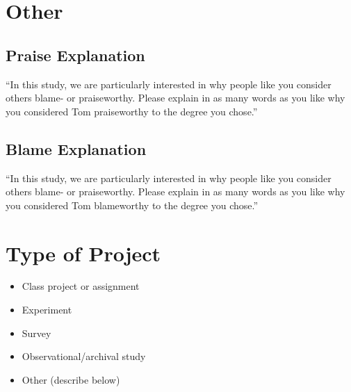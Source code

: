 \documentclass[scrarticle]{scrartcl}
\begin{document}
\section{Other}


\subsection*{Praise Explanation}
\enquote{In this study, we are particularly interested in why people like you consider others blame- or praiseworthy.
Please explain in as many words as you like why you considered Tom praiseworthy to the degree you chose.}


\subsection*{Blame Explanation}
\enquote{In this study, we are particularly interested in why people like you consider others blame- or praiseworthy.
Please explain in as many words as you like why you considered Tom blameworthy to the degree you chose.}


\section{Type of Project}
\begin{itemize}[label=\Square,noitemsep]
   \item Class project or assignment
   \item[\XBox] Experiment
   \item Survey
   \item Observational/archival study
   \item Other (describe below)
\end{itemize}
\end{document}
